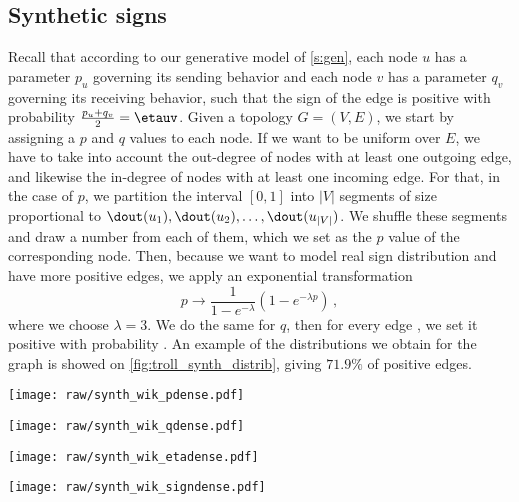 \begin{newcontent}
\subsection{Synthetic signs}

Recall that according to our generative model of \autoref{s:gen}, each node $u$ has a parameter $p_u$
governing its sending behavior and each node $v$ has a parameter $q_v$ governing its receiving
behavior, such that the sign of the edge \euv{} is positive with probability $\frac{p_u+q_v}{2} =
\etauv$. Given a topology $G=(V,E)$, we start by assigning a $p$ and $q$ values to each node. If we
want \etauv{} to be uniform over $E$, we have to take into account the out-degree of nodes with at
least one outgoing edge, and likewise the in-degree of nodes with at least one incoming edge. For
that, in the case of $p$, we partition the interval $[0,1]$ into $|V|$ segments of size proportional
to $\dout(u_1),
\dout(u_2), \ldots, \dout(u_{|V|})$. We shuffle these segments and draw a number \uar{} from each of
them, which we set as the $p$ value of the corresponding node. Then, because we want to model real
sign distribution and have more
positive edges, we apply an exponential transformation \[ p \rightarrow \frac{1}{1-e^{-\lambda}}
\left( 1-e^{-\lambda p} \right) \,,\] where we choose $\lambda=3$. We do the same for $q$, then for
every edge \euv{}, we set it positive with probability \etauv{}. An example of the distributions we
obtain for the \wik{} graph is showed on \autoref{fig:troll_synth_distrib}, giving $71.9\%$ of
positive edges.

\vspace{\baselineskip}
\noindent\begin{minipage}{187mm} 
  \begin{minipage}{46mm}
    \centering
    \texttt{[image: raw/synth\_wik\_pdense.pdf]}
  \end{minipage}%
  \begin{minipage}{46mm}
    \centering 
    \texttt{[image: raw/synth\_wik\_qdense.pdf]} 
  \end{minipage} 
  \begin{minipage}{46mm}
    \centering 
    \texttt{[image: raw/synth\_wik\_etadense.pdf]} 
  \end{minipage} 
  \begin{minipage}{46mm}
    \centering 
    \texttt{[image: raw/synth\_wik\_signdense.pdf]}
  \end{minipage} 
  \label{fig:troll_synth_distrib} 
\end{minipage}
\vspace{\baselineskip}


\end{newcontent}
